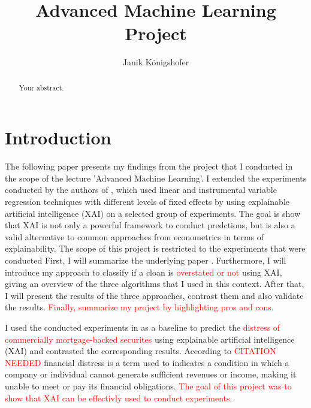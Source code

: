 \documentclass{article}
\title{Advanced Machine Learning Project}
\author{Janik Königshofer}
\begin{document}
\maketitle

\begin{abstract}
Your abstract.
\end{abstract}

\section{Introduction}
The following paper presents my findings from the project that I conducted in the scope of the lecture 'Advanced Machine Learning'.
I extended the experiments conducted by the authors of \cite{CMBS-Paper}, which used linear and instrumental variable regression techniques with different levels of fixed effects by using explainable artificial intelligence (XAI) on a selected group of experiments.
The goal is show that XAI is not only a powerful framework to conduct predctions, but is also a valid alternative to common approaches from econometrics in terms of explainability.
The scope of this project is restricted to the experiments that were conducted 
First, I will summarize the underlying paper \cite{CMBS-Paper}. Furthermore, I will introduce my approach to classify if a cloan is \textcolor{red}{overstated or not} using XAI, giving an overview of the three algorithms that I used in this context. After that, I will present the results of the three approaches, contrast them and also validate the results.
\textcolor{red}{Finally, summarize my project by highlighting pros and cons}.


I used the conducted experiments in \cite{CMBS-Paper} as a baseline to predict the \textcolor{red}{distress of commercially mortgage-backed securites} using explainable artificial intelligence (XAI) and contrasted the corresponding results.
According to \textcolor{red}{CITATION NEEDED} financial distress is a term used to indicates a condition in which a company or individual cannot generate sufficient revenues or income, making it unable to meet or pay its financial obligations. 
\textcolor{red}{The goal of this project was to show that XAI can be effectivly used to conduct experiments}.
\end{document}
